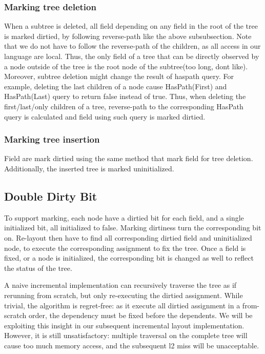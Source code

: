 \documentclass[format=acmsmall, review=false, screen=true]{acmart}
\begin{document}
\subsubsection{Marking tree deletion}
When a subtree is deleted, all field depending on any field in the root of the tree is marked dirtied, by following reverse-path like the above subsubsection. Note that we do not have to follow the reverse-path of the children, as all access in our language are local. Thus, the only field of a tree that can be directly observed by a node outside of the tree is the root node of the subtree(too long, dont like). Moreover, subtree deletion might change the result of haspath query. For example, deleting the last children of a node cause HasPath(First) and HasPath(Last) query to return false instead of true. Thus, when deleting the first/last/only children of a tree, reverse-path to the corresponding HasPath query is calculated and field using such query is marked dirtied.
\subsubsection{Marking tree insertion}
Field are mark dirtied using the same method that mark field for tree deletion. Additionally, the inserted tree is marked uninitialized.

\subsection{Double Dirty Bit}
To support marking, each node have a dirtied bit for each field, and a single initialized bit, all initialized to false. Marking dirtiness turn the corresponding bit on. Re-layout then have to find all corresponding dirtied field and uninitialized node, to execute the corresponding assignment to fix the tree. Once a field is fixed, or a node is initialized, the corresponding bit is changed as well to reflect the status of the tree.

A naive incremental implementation can recursively traverse the tree as if rerunning from scratch, but only re-executing the dirtied assignment. While trivial, the algorithm is regret-free: as it execute all dirtied assignment in a from-scratch order, the dependency must be fixed before the dependents. We will be exploiting this insight in our subsequent incremental layout implementation. However, it is still unsatisfactory: multiple traversal on the complete tree will cause too much memory access, and the subsequent l2 miss will be unacceptable.
\end{document}
